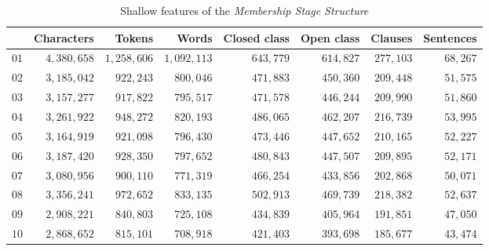 \documentclass{article}
\begin{document}
\begin{table}[htb]
\centering
\small
\begin{tabular}{lrrrrrrr}
\toprule
{} &  Characters &   Tokens &    Words &  Closed class &  Open class &  Clauses &  Sentences \\
\midrule
$01$ &     $4,380,658$ & $1,258,606$   &  $1,092,113$ &        $643,779$ &      $614,827$ &   $277,103$ &      $68,267$ \\
$02$ &     $3,185,042$ &   $922,243$   &    $800,046$ &        $471,883$ &      $450,360$ &   $209,448$ &      $51,575$ \\
$03$ &     $3,157,277$ &   $917,822$   &    $795,517$ &        $471,578$ &      $446,244$ &   $209,990$ &      $51,860$ \\
$04$ &     $3,261,922$ &   $948,272$   &    $820,193$ &        $486,065$ &      $462,207$ &   $216,739$ &      $53,995$ \\
$05$ &     $3,164,919$ &   $921,098$   &    $796,430$ &        $473,446$ &      $447,652$ &   $210,165$ &      $52,227$ \\
$06$ &     $3,187,420$ &   $928,350$   &    $797,652$ &        $480,843$ &      $447,507$ &   $209,895$ &      $52,171$ \\
$07$ &     $3,080,956$ &   $900,110$   &    $771,319$ &        $466,254$ &      $433,856$ &   $202,868$ &      $50,071$ \\
$08$ &     $3,356,241$ &   $972,652$   &    $833,135$ &        $502,913$ &      $469,739$ &   $218,382$ &      $52,637$ \\
$09$ &     $2,908,221$ &   $840,803$   &    $725,108$ &        $434,839$ &      $405,964$ &   $191,851$ &      $47,050$ \\
$10$ &     $2,868,652$ &   $815,101$   &    $708,918$ &        $421,403$ &      $393,698$ &   $185,677$ &      $43,474$ \\
\bottomrule
\end{tabular}
\caption{Shallow features of the \emph{Membership Stage Structure}}
\label{tab:shallow_P}
\end{table}
\end{document}

